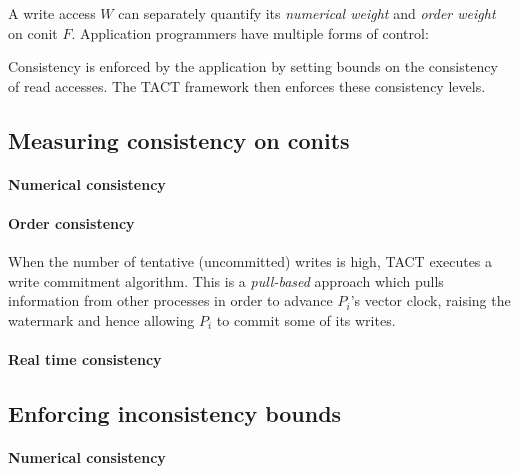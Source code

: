 \documentclass[]             %
{NASA}                       %
\theoremstyle{definition}
\begin{document}
A write access \(W\) can separately quantify its \emph{numerical weight}
and \emph{order weight} on conit \(F\). Application programmers have
multiple forms of control:

Consistency is enforced by the application by setting bounds on the
consistency of read accesses. The TACT framework then enforces these
consistency levels.

\hypertarget{measuring-consistency-on-conits}{%
  \subsection{Measuring consistency on
    conits}\label{measuring-consistency-on-conits}}

\hypertarget{numerical-consistency}{%
  \paragraph{Numerical consistency}\label{numerical-consistency}}

\hypertarget{order-consistency}{%
  \paragraph{Order consistency}\label{order-consistency}}

When the number of tentative (uncommitted) writes is high, TACT executes
a write commitment algorithm. This is a \emph{pull-based} approach which
pulls information from other processes in order to advance \(P_i\)'s
vector clock, raising the watermark and hence allowing \(P_i\) to commit
some of its writes.

\hypertarget{real-time-consistency}{%
  \paragraph{Real time consistency}\label{real-time-consistency}}

\hypertarget{enforcing-inconsistency-bounds}{%
  \subsection{Enforcing inconsistency
    bounds}\label{enforcing-inconsistency-bounds}}

\hypertarget{numerical-consistency-1}{%
  \paragraph{Numerical consistency}\label{numerical-consistency-1}}
\end{document}
